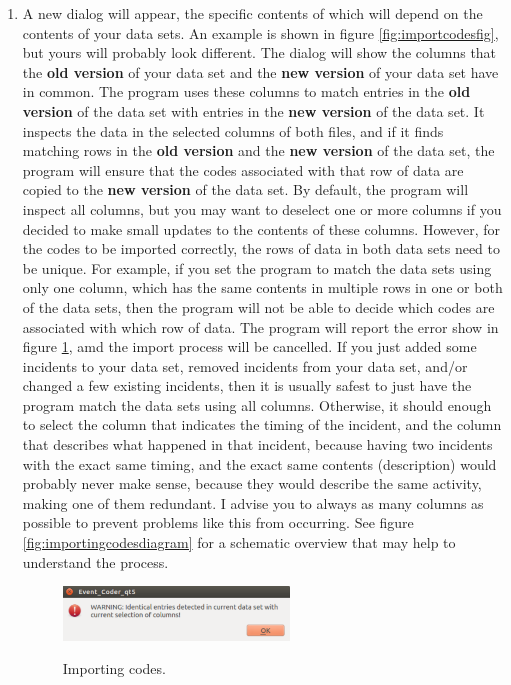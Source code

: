 \documentclass{memoir}
\begin{document}
\begin{enumerate}
\item{A new dialog will appear, the specific contents of which will depend on the contents of your data sets. An example is shown in figure \ref{fig:importcodesfig}, but yours will probably look different. The dialog will show the columns that the \textbf{old version} of your data set and the \textbf{new version} of your data set have in common. The program uses these columns to match entries in the \textbf{old version} of the data set with entries in the \textbf{new version} of the data set. It inspects the data in the selected columns of both files, and if it finds matching rows in the \textbf{old version} and the \textbf{new version} of the data set, the program will ensure that the codes associated with that row of data are copied to the \textbf{new version} of the data set. By default, the program will inspect all columns, but you may want to deselect one or more columns if you decided to make small updates to the contents of these columns. However, for the codes to be imported correctly, the rows of data in both data sets need to be unique. For example, if you set the program to match the data sets using only one column, which has the same contents in multiple rows in one or both of the data sets, then the program will not be able to decide which codes are associated with which row of data. The program will report the error show in figure \ref{fig:importingcodeserror}, amd the import process will be cancelled. If you just added some incidents to your data set, removed incidents from your data set, and/or changed a few existing incidents, then it is usually safest to just have the program match the data sets using all columns. Otherwise, it should enough to select the column that indicates the timing of the incident, and the column that describes what happened in that incident, because having two incidents with the exact same timing, and the exact same contents (description) would probably never make sense, because they would describe the same activity, making one of them redundant. I advise you to always as many columns as possible to prevent problems like this from occurring. See figure \ref{fig:importingcodesdiagram} for a schematic overview that may help to understand the process.}
  \begin{figure}[h!]
  \centering
  \caption{Importing codes.}
  \includegraphics[width=60mm]{Screenshot_26.pdf}
  \label{fig:importingcodeserror}
\end{figure}


\end{enumerate}
\end{document}
